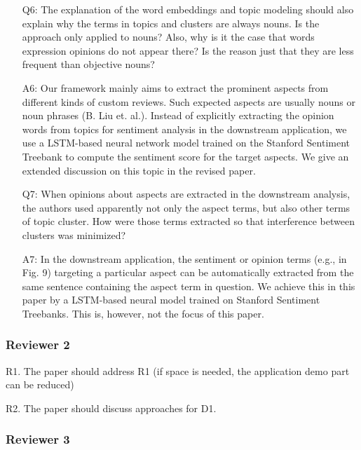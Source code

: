 \begin{itemize}
\item [Q6:] 
The explanation of the word embeddings and topic modeling should also explain why the terms in topics and clusters are always nouns. Is the approach only applied to nouns? Also, why is it the case that words expression opinions do not appear there? Is the	reason just that they are less frequent than objective nouns?
\item [A6:] 
Our framework mainly aims to extract the prominent aspects from different kinds of custom reviews. 
Such expected aspects are usually nouns or noun phrases (B. Liu et. al.). Instead of explicitly extracting the opinion words from topics for  sentiment analysis in the downstream application, we use a LSTM-based neural network model trained on the Stanford Sentiment Treebank to compute the sentiment score for the target aspects. 
We give an extended discussion on this topic in the revised paper. 
	
\item [Q7: ] 
When opinions about aspects are extracted in the downstream analysis, the authors used apparently not only the aspect terms, but also other terms of topic cluster. How were those terms extracted so that interference between clusters was minimized?
\item [A7:] 
In the downstream application, the sentiment or opinion terms (e.g., in
Fig. 9) targeting a particular aspect can be automatically extracted from
the same sentence containing the aspect term in question. We achieve this 
in this paper by a LSTM-based neural model trained on Stanford Sentiment 
Treebanks. This is, however, not the focus of this paper. 
\end{itemize}


\subsubsection{Reviewer 2}

R1. The paper should address R1 (if space is needed, the application demo part can be reduced)

R2. The paper should discuss approaches for D1.

\subsubsection{Reviewer 3}

